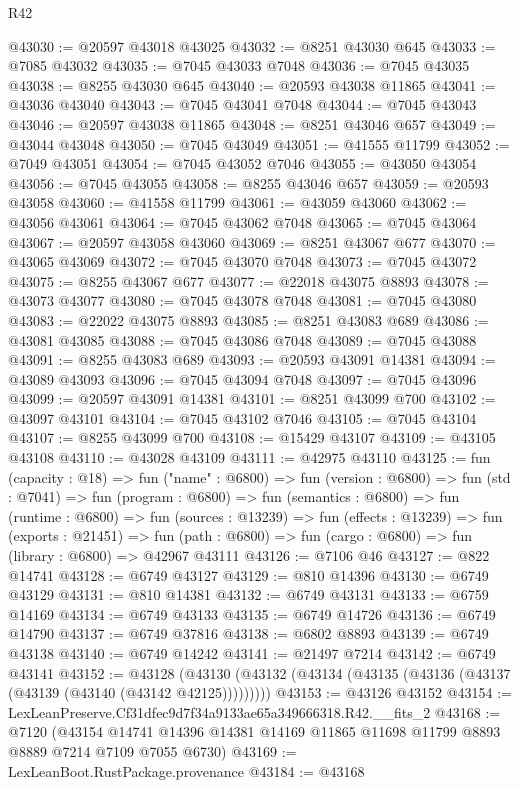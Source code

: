 \begin{lexlean}{R42}
\begin{coremodule}
{@43030 := @20597 @43018 @43025
@43032 := @8251 @43030 @645
@43033 := @7085 @43032
@43035 := @7045 @43033 @7048
@43036 := @7045 @43035
@43038 := @8255 @43030 @645
@43040 := @20593 @43038 @11865
@43041 := @43036 @43040
@43043 := @7045 @43041 @7048
@43044 := @7045 @43043
@43046 := @20597 @43038 @11865
@43048 := @8251 @43046 @657
@43049 := @43044 @43048
@43050 := @7045 @43049
@43051 := @41555 @11799
@43052 := @7049 @43051
@43054 := @7045 @43052 @7046
@43055 := @43050 @43054
@43056 := @7045 @43055
@43058 := @8255 @43046 @657
@43059 := @20593 @43058
@43060 := @41558 @11799
@43061 := @43059 @43060
@43062 := @43056 @43061
@43064 := @7045 @43062 @7048
@43065 := @7045 @43064
@43067 := @20597 @43058 @43060
@43069 := @8251 @43067 @677
@43070 := @43065 @43069
@43072 := @7045 @43070 @7048
@43073 := @7045 @43072
@43075 := @8255 @43067 @677
@43077 := @22018 @43075 @8893
@43078 := @43073 @43077
@43080 := @7045 @43078 @7048
@43081 := @7045 @43080
@43083 := @22022 @43075 @8893
@43085 := @8251 @43083 @689
@43086 := @43081 @43085
@43088 := @7045 @43086 @7048
@43089 := @7045 @43088
@43091 := @8255 @43083 @689
@43093 := @20593 @43091 @14381
@43094 := @43089 @43093
@43096 := @7045 @43094 @7048
@43097 := @7045 @43096
@43099 := @20597 @43091 @14381
@43101 := @8251 @43099 @700
@43102 := @43097 @43101
@43104 := @7045 @43102 @7046
@43105 := @7045 @43104
@43107 := @8255 @43099 @700
@43108 := @15429 @43107
@43109 := @43105 @43108
@43110 := @43028 @43109
@43111 := @42975 @43110
@43125 := fun (capacity : @18) =>
  fun ("name" : @6800) =>
  fun (version : @6800) =>
  fun (std : @7041) =>
  fun (program : @6800) =>
  fun (semantics : @6800) =>
  fun (runtime : @6800) =>
  fun (sources : @13239) =>
  fun (effects : @13239) =>
  fun (exports : @21451) =>
  fun (path : @6800) => fun (cargo : @6800) => fun (library : @6800) => @42967 @43111
@43126 := @7106 @46
@43127 := @822 @14741
@43128 := @6749 @43127
@43129 := @810 @14396
@43130 := @6749 @43129
@43131 := @810 @14381
@43132 := @6749 @43131
@43133 := @6759 @14169
@43134 := @6749 @43133
@43135 := @6749 @14726
@43136 := @6749 @14790
@43137 := @6749 @37816
@43138 := @6802 @8893
@43139 := @6749 @43138
@43140 := @6749 @14242
@43141 := @21497 @7214
@43142 := @6749 @43141
@43152 := @43128
    (@43130 (@43132 (@43134 (@43135 (@43136 (@43137 (@43139 (@43140 (@43142 @42125)))))))))
@43153 := @43126 @43152
@43154 := LexLeanPreserve.Cf31dfec9d7f34a9133ae65a349666318.R42.__fits_2
@43168 := @7120
    (@43154 @14741 @14396 @14381 @14169 @11865 @11698 @11799 @8893 @8889 @7214 @7109 @7055 @6730)
@43169 := LexLeanBoot.RustPackage.provenance
@43184 := @43168
}
\end{coremodule}
\end{lexlean}
